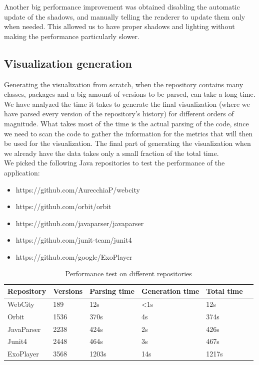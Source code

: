 \documentclass[]{usiinfbachelorproject}
\begin{document}
Another big performance improvement was obtained disabling the automatic update of the shadows, and manually telling the renderer to update them only when needed. This allowed us to have proper shadows and lighting without making the performance particularly slower.

\subsection{Visualization generation} \label{Visualization generation}

Generating the visualization from scratch, when the repository contains many classes, packages and a big amount of versions to be parsed, can take a long time. We have analyzed the time it takes to generate the final visualization (where we have parsed every version of the repository's history) for different orders of magnitude. What takes most of the time is the actual parsing of the code, since we need to scan the code to gather the information for the metrics that will then be used for the visualization. The final part of generating the visualization when we already have the data takes only a small fraction of the total time.\\

We picked the following Java repositories to test the performance of the application:

\begin{itemize}
    \item https://github.com/AurecchiaP/webcity
    \item https://github.com/orbit/orbit
    \item https://github.com/javaparser/javaparser
    \item https://github.com/junit-team/junit4
    \item https://github.com/google/ExoPlayer
\end{itemize}

\begin{table}[H]
    \begin{center}
        \begin{tabular}{ | l | l | l | l | l | l |}
        \hline
        Repository & Versions & Parsing time & Generation time & Total time \\ \hline
        WebCity & 189 & 12s & <1s & 12s \\ \hline
        Orbit & 1536 & 370s & 4s & 374s \\ \hline
        JavaParser & 2238 & 424s & 2s & 426s \\ \hline
        Junit4 & 2448 & 464s & 3s & 467s \\ \hline
        ExoPlayer & 3568 & 1203s & 14s & 1217s \\ \hline
        \end{tabular}
    \end{center}
    \caption{Performance test on different repositories}
    \label{tab:performance}
\end{table}
\end{document}
